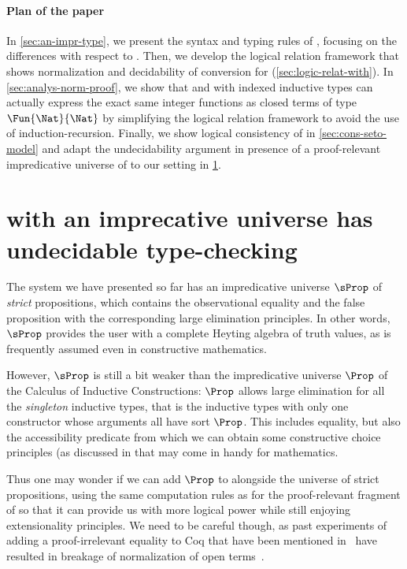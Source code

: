 \paragraph{Plan of the paper}

In \cref{sec:an-impr-type}, we present the syntax and typing rules of
\SetoidCC, focusing on the differences with respect to \SetoidTT.
%
Then, we develop the logical relation
framework that shows normalization and decidability of conversion for
\SetoidCC (\cref{sec:logic-relat-with}).
%
In \cref{sec:analys-norm-proof}, we show that \SetoidCC and \MLTT with
indexed inductive types can
actually express the exact same integer functions
  as closed terms of type \( \Fun{\Nat}{\Nat} \) by simplifying the
  logical relation framework to avoid the use of induction-recursion.
  Finally, we show logical consistency of \SetoidCC in
  \cref{sec:cons-seto-model} and adapt the undecidability argument in
  presence of a proof-relevant impredicative universe of
   to our setting in \cref{sec:setoidcc-with-an}.

  \section{\SetoidCC with an imprecative universe has undecidable type-checking}
  \label{sec:setoidcc-with-an}
  
  The system we have presented so far has an impredicative universe
  \( \sProp \) of \emph{strict} propositions, which contains the observational
  equality and the false proposition with the corresponding large
  elimination principles.
  In other words, \( \sProp \) provides the user with a complete Heyting
  algebra of truth values, as is frequently assumed even in constructive
  mathematics.
  
  However, \( \sProp \) is still a bit weaker than the impredicative
  universe \( \Prop \) of the Calculus of Inductive Constructions:
  \( \Prop \) allows large elimination for all the \emph{singleton}
  inductive types, that is the inductive types with only one constructor
  whose arguments all have sort \( \Prop \).
  This includes equality, but also the accessibility predicate from which
  we can obtain some constructive choice principles (as discussed in  that may
  come in handy for mathematics.
  
  Thus one may wonder if we can add \( \Prop \) to \SetoidCC alongside the
  universe of strict propositions, using the same computation rules as for the
  proof-relevant fragment of \SetoidCC so that it can provide us with
  more logical power while still enjoying extensionality principles.
  We need to be careful though, as past experiments of adding a
  proof-irrelevant equality to Coq that have been mentioned
  in~ have resulted in breakage of
  normalization of open terms~.
  
